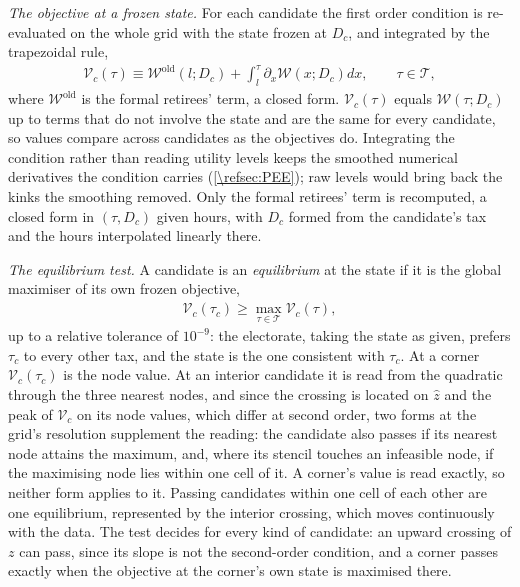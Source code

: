 \emph{The objective at a frozen state.} For each candidate the first order condition is re-evaluated on the whole grid with the state frozen at $D_c$, and integrated by the trapezoidal rule,
\begin{align}\label{\refeq:objectiveProfile}
    \mathcal{V}_c(\tau) \equiv \mathcal{W}^{\mathrm{old}}\left(l; D_c\right) + \int_l^{\tau}\partial_{x}\mathcal{W}\left(x; D_c\right)dx, \qquad \tau\in\mathcal{T},
\end{align}
where $\mathcal{W}^{\mathrm{old}}$ is the formal retirees' term, a closed form. $\mathcal{V}_c(\tau)$ equals $\mathcal{W}(\tau; D_c)$ up to terms that do not involve the state and are the same for every candidate, so values compare across candidates as the objectives do. Integrating the condition rather than reading utility levels keeps the smoothed numerical derivatives the condition carries (\cref{\refsec:PEE}); raw levels would bring back the kinks the smoothing removed. Only the formal retirees' term is recomputed, a closed form in $(\tau, D_c)$ given hours, with $D_c$ formed from the candidate's tax and the hours interpolated linearly there.

\emph{The equilibrium test.} A candidate is an \emph{equilibrium} at the state if it is the global maximiser of its own frozen objective,
\begin{align}\label{\refeq:equilibriumTest}
    \mathcal{V}_c(\tau_c) \geq \max_{\tau\in\mathcal{T}}\mathcal{V}_c(\tau),
\end{align}
up to a relative tolerance of $10^{-9}$: the electorate, taking the state as given, prefers $\tau_c$ to every other tax, and the state is the one consistent with $\tau_c$. At a corner $\mathcal{V}_c(\tau_c)$ is the node value. At an interior candidate it is read from the quadratic through the three nearest nodes, and since the crossing is located on $\hat{z}$ and the peak of $\mathcal{V}_c$ on its node values, which differ at second order, two forms at the grid's resolution supplement the reading: the candidate also passes if its nearest node attains the maximum, and, where its stencil touches an infeasible node, if the maximising node lies within one cell of it. A corner's value is read exactly, so neither form applies to it. Passing candidates within one cell of each other are one equilibrium, represented by the interior crossing, which moves continuously with the data. The test decides for every kind of candidate: an upward crossing of $z$ can pass, since its slope is not the second-order condition, and a corner passes exactly when the objective at the corner's own state is maximised there.

